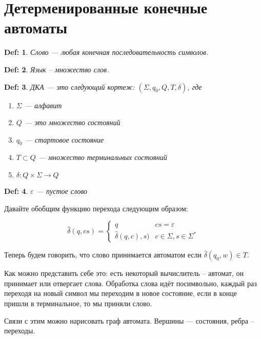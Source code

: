 \documentclass[10pt,a4paper]{article}
\newtheorem{Def}{Def:}
\begin{document}
\section{Детерменированные конечные автоматы}

\begin{Def}
    Слово --- любая конечная последовательность символов.
\end{Def}

\begin{Def}
    Язык -- множество слов.
\end{Def}

\begin{Def}
    ДКА --- это следующий кортеж: $(\Sigma, q_0, Q, T, \delta)$, где
    \begin{enumerate}
        \item $\Sigma$ --- алфавит
        \item $Q$ --- это множество состояний
        \item $q_0$ --- стартовое состояние
        \item $T \subset Q$ --- множество терминальных состояний
        \item $\delta: Q \times \Sigma \rightarrow Q$
    \end{enumerate}
\end{Def}

\begin{Def}
$\varepsilon$ --- пустое слово
\end{Def}

Давайте обобщим функцию перехода следующим образом:

$$ \hat{\delta}(q, cs) = 
    \left\{
        \begin{matrix}
            q & cs = \varepsilon \\
            \hat{\delta}(q, c), s) & 
            c \in \Sigma, s \in \Sigma^*        \end{matrix}
    \right.
$$

Теперь будем говорить, что слово принимается автоматом если 
$\hat{\delta}(q_0, w) \in T$.

Как можно представить себе это: есть некоторый вычислитель -- автомат, он принимает или отвергает слова. Обработка слова идёт
посимвольно, каждый раз переходя на новый символ мы переходим в новое состояние, если в конце пришли в терминальное, то мы приняли слово.


Связи с этим можно нарисовать граф автомата. Вершины --- состояния, ребра -- переходы.
\end{document}
